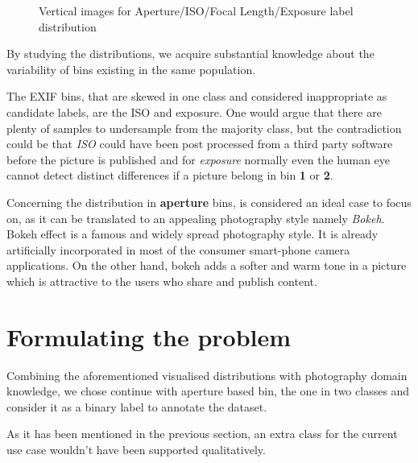 \begin{figure}[ht!]
    \caption{Vertical images for Aperture/ISO/Focal Length/Exposure label distribution}
    \label{c4:ver_distr}
\end{figure}


By studying the distributions, we acquire substantial knowledge about the variability of bins existing in the same population.

The EXIF bins, that are skewed in one class and considered inappropriate as candidate labels, are the ISO and exposure. One would argue that there are plenty of samples to undersample from the majority class, but the contradiction could be that \textit{ISO} could have been post processed from a third party software before the picture is published and for \textit{exposure} normally even the human eye cannot detect distinct differences if a picture belong in bin \textbf{1} or \textbf{2}.

Concerning the distribution in \textbf{aperture} bins, is considered an ideal case to focus on, as it can be translated to an appealing photography style namely \textit{Bokeh}.
Bokeh effect is a famous and widely spread photography style. It is already artificially incorporated in most of the consumer smart-phone camera applications.  On the other hand, bokeh adds a softer and warm tone in a picture which is attractive to the users who share and publish content.

\section{Formulating the problem}
\label{c4:problem_formulation}

Combining the aforementioned visualised distributions with photography domain knowledge, we chose continue with aperture based bin, the one in two classes and consider it as a binary label to annotate the dataset.

As it has been mentioned in the previous section, an extra class for the current use case wouldn't have been supported qualitatively.

